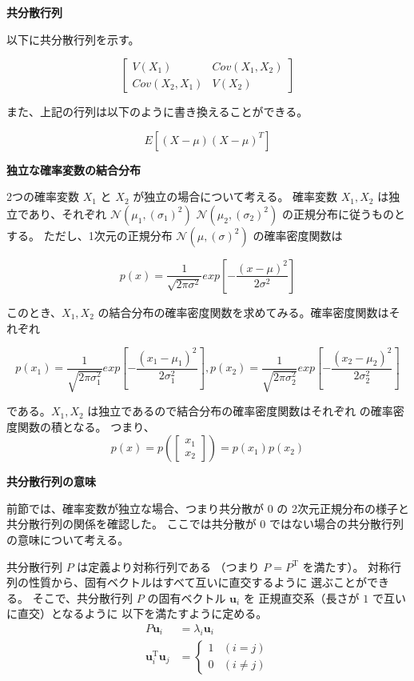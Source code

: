 \documentclass[10pt,a4paper,titlepage]{jreport} %
\begin{document}
\textbf{共分散行列}

以下に共分散行列を示す。

\begin{equation}
\begin{bmatrix}
V(X_1) & Cov(X_1, X_2) \\
Cov(X_2, X_1) & V(X_2)
\end{bmatrix}
\end{equation}

また、上記の行列は以下のように書き換えることができる。

\begin{equation}
E\left[(X - \mu)(X - \mu)^T\right]
\end{equation}

\textbf{独立な確率変数の結合分布}

2つの確率変数 $X_1$ と $X_2$ が独立の場合について考える。
確率変数 $X_1, X_2$ は独立であり、それぞれ $\mathcal{N}(\mu_1, (\sigma_1)^2)$ 
 $\mathcal{N}(\mu_2, (\sigma_2)^2)$ の正規分布に従うものとする。
 ただし、1次元の正規分布 $\mathcal{N}(\mu, (\sigma)^2)$ の確率密度関数は

\begin{equation}
p(x) = \frac{1}{\sqrt{2\pi\sigma^2}}exp\left[-\frac{(x - \mu)^2}{2\sigma^2}\right]
\end{equation}

このとき、$X_1, X_2$ の結合分布の確率密度関数を求めてみる。確率密度関数はそれぞれ

\begin{equation}
p(x_1) = \frac{1}{\sqrt{2\pi\sigma_{1}^2}}exp\left[-\frac{(x_1 - \mu_1)^2}{2\sigma_{1}^2}\right],
p(x_2) = \frac{1}{\sqrt{2\pi\sigma_{2}^2}}exp\left[-\frac{(x_2 - \mu_2)^2}{2\sigma_{2}^2}\right]
\end{equation}

である。$X_1, X_2$ は独立であるので結合分布の確率密度関数はそれぞれ
の確率密度関数の積となる。
つまり、
\begin{equation}
p(x) = p(\begin{bmatrix} x_1 \\ x_2 \end{bmatrix}) = p(x_1)p(x_2)
\end{equation}

\textbf{共分散行列の意味}

前節では、確率変数が独立な場合、つまり共分散が $0$ の
2次元正規分布の様子と共分散行列の関係を確認した。
ここでは共分散が $0$ ではない場合の共分散行列の意味について考える。

共分散行列 $P$ は定義より対称行列である
（つまり $P = P^{\mathrm{T}}$ を満たす）。
対称行列の性質から、固有ベクトルはすべて互いに直交するように
選ぶことができる。
そこで、共分散行列 $P$ の固有ベクトル $\mathbf{u}_i$ を
正規直交系（長さが $1$ で互いに直交）となるように
以下を満たすように定める。
\begin{align}
P\mathbf{u}_i &= \lambda_i \mathbf{u}_i \\
\mathbf{u}_i^{\mathrm{T}}\mathbf{u}_j &=
\begin{cases}
1 & (i=j) \\
0 & (i\neq j)
\end{cases}
\end{align}
\end{document}
